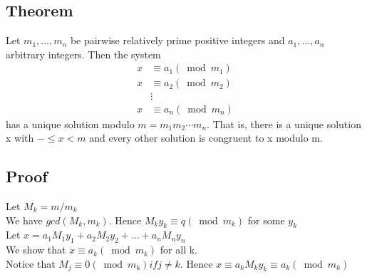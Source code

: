 \documentclass{article}[18pt]
\begin{document}
\subsection{Theorem}
Let $m_1,...,m_n$ be pairwise relatively prime positive integers and $a_1,...,a_n$ arbitrary integers. Then the system
$$\begin{aligned} x & \equiv a _ { 1 } \left( \bmod m _ { 1 } \right) \\ x & \equiv a _ { 2 } \left( \bmod m _ { 2 } \right) \\ & \vdots \\ x & \equiv a _ { n } \left( \bmod m _ { n } \right) \end{aligned}$$
has a unique solution modulo $m=m_1m_2\cdots m_n$. That is, there is a unique solution x with $-\leqslant x <m$ and every other solution is congruent to x modulo m.
\subsection{Proof}
Let $M_k=m/m_k$\\
We have $gcd(M_k,m_k)$. Hence $M_ky_k\equiv q (\bmod m_k)$ for some $y_k$\\
Let $x=a_1M_1y_1+a_2M_2y_2+...+a_nM_ny_n$\\
We show that $x\equiv a_k (\bmod m_k)$ for all k.\\
Notice that $M_j\equiv 0 (\bmod m_k) if j\neq k$. Hence $x\equiv a_kM_ky_k\equiv a_k (\bmod m_k)$
\end{document}

